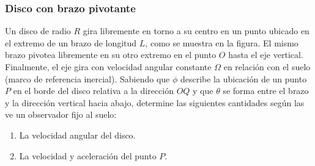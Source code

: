 \subsubsection{Disco con brazo pivotante}

Un disco de radio $R$ gira libremente en torno a su centro en un punto ubicado en el extremo de un brazo de longitud $L$, como se muestra en la figura. El mismo brazo pivotea libremente en su otro extremo en el punto $O$ hasta el eje vertical. Finalmente, el eje gira con velocidad angular constante $\Omega$ en relación con el suelo (marco de referencia inercial). Sabiendo que $\phi$ describe la ubicación de un punto $P$ en el borde del disco relativa a la dirección $OQ$ y que $\theta$ se forma entre el brazo y la dirección vertical hacia abajo, determine las siguientes cantidades según las ve un observador fijo al suelo:

\begin{enumerate}
    \item La velocidad angular del disco.
    \item La velocidad y aceleración del punto $P$.
\end{enumerate}

